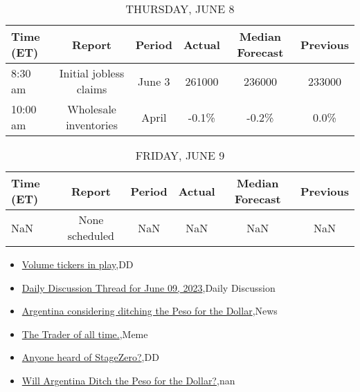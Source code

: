 \documentclass{article}%
\begin{document}
%


\begin{table}[htbp]%
\caption{THURSDAY, JUNE 8}%
\centering%
\begin{adjustbox}{width=1\textwidth}%
\begin{tabular}{lccccc}
\toprule
Time (ET) &                 Report & Period & Actual & Median Forecast & Previous \\
\midrule
  8:30 am & Initial jobless claims & June 3 & 261000 &          236000 &   233000 \\
 10:00 am &  Wholesale inventories &  April &  -0.1\% &           -0.2\% &     0.0\% \\
\bottomrule
\end{tabular}
%
\end{adjustbox}%
\end{table}

%


\begin{table}[htbp]%
\caption{FRIDAY, JUNE 9}%
\centering%
\begin{adjustbox}{width=1\textwidth}%
\begin{tabular}{lccccc}
\toprule
Time (ET) &         Report & Period & Actual & Median Forecast & Previous \\
\midrule
      NaN & None scheduled &    NaN &    NaN &             NaN &      NaN \\
\bottomrule
\end{tabular}
%
\end{adjustbox}%
\end{table}

%
\begin{itemize}%
\item%
\href{https://reddit.com/r/wallstreetbets/comments/1453lq2/volume\_tickers\_in\_play/}{Volume tickers in play},DD%
\item%
\href{https://reddit.com/r/wallstreetbets/comments/14512hs/daily\_discussion\_thread\_for\_june\_09\_2023/}{Daily Discussion Thread for June 09, 2023},Daily Discussion%
\item%
\href{https://reddit.com/r/wallstreetbets/comments/144z3ds/argentina\_considering\_ditching\_the\_peso\_for\_the/}{Argentina considering ditching the Peso for the Dollar},News%
\item%
\href{https://reddit.com/r/wallstreetbets/comments/144y38i/the\_trader\_of\_all\_time/}{The Trader of all time.},Meme%
\item%
\href{https://reddit.com/r/Baystreetbets/comments/144fqcg/anyone\_heard\_of\_stagezero/}{Anyone heard of StageZero?},DD%
\item%
\href{https://reddit.com/r/Economics/comments/144ysni/will\_argentina\_ditch\_the\_peso\_for\_the\_dollar/}{Will Argentina Ditch the Peso for the Dollar?},nan%
\end{itemize}%
\end{document}
